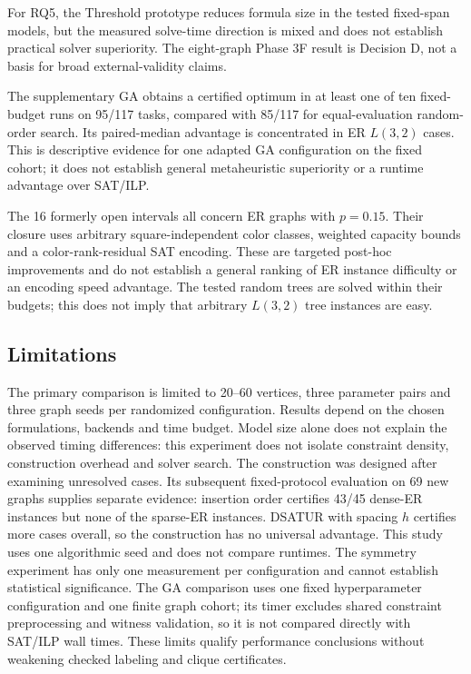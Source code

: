 For RQ5, the Threshold prototype reduces formula size in the tested
fixed-span models, but the measured solve-time direction is mixed and
does not establish practical solver superiority. The eight-graph Phase 3F
result is Decision D, not a basis for broad external-validity claims.

The supplementary GA obtains a certified optimum in at least one of ten
fixed-budget runs on 95/117 tasks, compared with 85/117 for equal-evaluation
random-order search. Its paired-median advantage is concentrated in ER
$L(3,2)$ cases. This is descriptive evidence for one adapted GA
configuration on the fixed cohort; it does not establish general
metaheuristic superiority or a runtime advantage over SAT/ILP.

The 16 formerly open intervals all concern ER graphs with $p=0.15$.
Their closure uses arbitrary square-independent color classes, weighted
capacity bounds and a color-rank-residual SAT encoding. These are targeted
post-hoc improvements and do not establish a general ranking of ER
instance difficulty or an encoding speed advantage. The tested random trees are solved within their
budgets; this does not imply that arbitrary $L(3,2)$ tree instances are easy.

\subsection{Limitations}
The primary comparison is limited to 20--60 vertices, three parameter
pairs and three graph seeds per randomized configuration. Results depend
on the chosen formulations, backends and time budget. Model size alone
does not explain the observed timing differences: this experiment does
not isolate constraint density, construction overhead and solver search.
The construction
was designed after examining unresolved cases. Its subsequent
fixed-protocol evaluation on 69 new graphs supplies separate evidence:
insertion order certifies 43/45 dense-ER instances but none of the
sparse-ER instances. DSATUR with spacing $h$ certifies more cases
overall, so the construction has no universal advantage. This study
uses one algorithmic seed and does not compare runtimes. The symmetry experiment has only one measurement per
configuration and cannot establish statistical significance. The GA
comparison uses one fixed hyperparameter configuration and one finite graph
cohort; its timer excludes shared constraint preprocessing and witness
validation, so it is not compared directly with SAT/ILP wall times. These
limits qualify performance conclusions without weakening checked labeling
and clique certificates.

